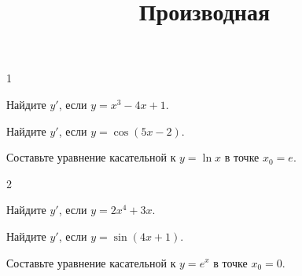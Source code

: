 \documentclass[kr]{petrovsky}
\title{Производная}
\begin{document}
\begin{variant}{1}
\begin{task}[2 балла] Найдите $y'$, если $y = x^3 - 4x + 1$. \end{task}
\begin{task}[3 балла] Найдите $y'$, если $y = \cos(5x-2)$. \end{task}
\begin{task}[5 баллов] Составьте уравнение касательной к $y = \ln x$ в точке $x_0 = e$.  \end{task}
\end{variant}

\begin{variant}{2}
\begin{task}[2 балла] Найдите $y'$, если $y = 2x^4 + 3x$. \end{task}
\begin{task}[3 балла] Найдите $y'$, если $y = \sin(4x+1)$. \end{task}
\begin{task}[5 баллов] Составьте уравнение касательной к $y = e^x$ в точке $x_0 = 0$.  \end{task}
\end{variant}
\end{document}
